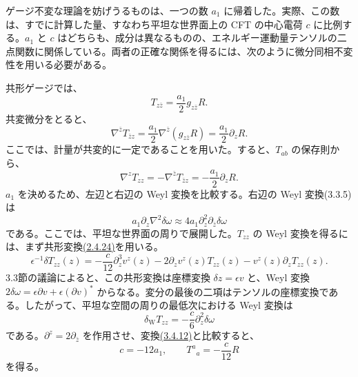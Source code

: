 
ゲージ不変な理論を妨げうるものは、一つの数 $a_1$ に帰着した。実際、この数は、すでに計算した量、すなわち平坦な世界面上の CFT の中心電荷 $c$ に比例する。$a_1$ と $c$ はどちらも、成分は異なるものの、エネルギー運動量テンソルの二点関数に関係している。両者の正確な関係を得るには、次のように微分同相不変性を用いる必要がある。

共形ゲージでは、
\begin{equation}
T_{z\bar z}=\frac{a_1}2g_{z\bar z}R.
\tag{3.4.9}\label{eq:3.4.9}
\end{equation}
共変微分をとると、
\begin{equation}
\nabla^{\bar z}T_{\bar z z}
=\frac{a_1}2\nabla^{\bar z}(g_{z\bar z}R)
=\frac{a_1}2\partial_zR.
\tag{3.4.10}\label{eq:3.4.10}
\end{equation}
ここでは、計量が共変的に一定であることを用いた。すると、$T_{ab}$ の保存則から、
\begin{equation}
\nabla^zT_{zz}=-\nabla^{\bar z}T_{\bar z z}
=-\frac{a_1}2\partial_zR.
\tag{3.4.11}\label{eq:3.4.11}
\end{equation}
$a_1$ を決めるため、左辺と右辺の Weyl 変換を比較する。右辺の Weyl 変換(3.3.5)は
\begin{equation}
a_1\partial_z\nabla^2\delta\omega
\approx4a_1\partial_z^2\partial_{\bar z}\delta\omega
\tag{3.4.12}\label{eq:3.4.12}
\end{equation}
である。ここでは、平坦な世界面の周りで展開した。$T_{zz}$ の Weyl 変換を得るには、まず共形変換\hyperref[eq:2.4.24]{(2.4.24)}を用いる。
\begin{equation}
\epsilon^{-1}\delta T_{zz}(z)
=-\frac c{12}\partial_z^3v^z(z)
-2\partial_zv^z(z)T_{zz}(z)-v^z(z)\partial_zT_{zz}(z).
\tag{3.4.13}\label{eq:3.4.13}
\end{equation}
3.3節の議論によると、この共形変換は座標変換 $\delta z=\epsilon v$ と、Weyl 変換 $2\delta\omega=\epsilon\partial v+\epsilon(\partial v)^*$ からなる。変分の最後の二項はテンソルの座標変換である。したがって、平坦な空間の周りの最低次における Weyl 変換は
\begin{equation}
\delta_{\mathrm W}T_{zz}=-\frac c6\partial_z^2\delta\omega
\tag{3.4.14}\label{eq:3.4.14}
\end{equation}
である。$\partial^z=2\partial_{\bar z}$ を作用させ、変換\hyperref[eq:3.4.12]{(3.4.12)}と比較すると、
\begin{equation}
c=-12a_1,\qquad T^a{}_a=-\frac c{12}R
\tag{3.4.15}\label{eq:3.4.15}
\end{equation}
を得る。

